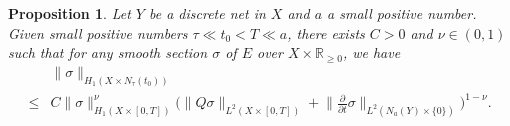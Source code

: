 \documentclass[10pt,a4paper]{amsart}
\newtheorem{proposition}{Proposition}
\newcommand{\R}{\mathbb{R}}
\begin{document}
\begin{proposition}\label{prop:interpolation}
		Let $Y$ be a discrete net in $X$ and $a$ a small positive number. Given small positive numbers $\tau\ll t_0<T\ll a$, there exists $C>0$ and $\nu\in(0,1)$ such that for any smooth section $\sigma$ of $E$ over $X\times\R_{\geq 0}$, we have
	\begin{equation}\label{eq:interpolation}
	\begin{split}
			&\|\sigma\|_{H_1(X\times N_\tau(t_0))}\\\leq &C \|\sigma\|_{H_1(X\times[0,T])}^\nu\Big(\|Q\sigma\|_{L^2(X\times[0,T])}+\Big\|\frac{\partial}{\partial t}\sigma\Big\|_{L^2(N_a(Y)\times\{0\})}\Big)^{1-\nu}.
	\end{split}
	\end{equation}
\end{proposition}
\end{document}
